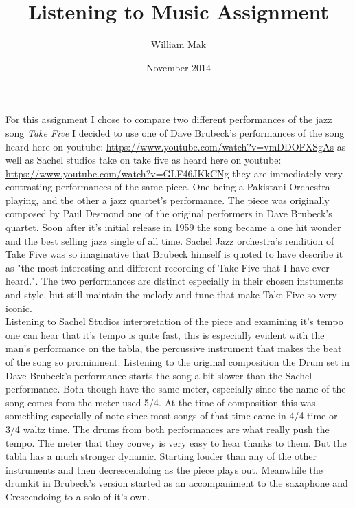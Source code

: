 \documentclass{article}
\title{Listening to Music Assignment}
\author{William Mak}
\date{November 2014}
\begin{document}
\maketitle

For this assignment I chose to compare two different performances of the jazz 
song {\it Take Five} I decided to use one of Dave Brubeck's performances of the 
song heard here on youtube:
\url{https://www.youtube.com/watch?v=vmDDOFXSgAs}
as well as Sachel studios take on take five as heard here on youtube:
\url{https://www.youtube.com/watch?v=GLF46JKkCNg}
they are immediately very contrasting performances of the same piece. One being
a Pakistani Orchestra playing, and the other a jazz quartet's performance. The
piece was originally composed by Paul Desmond one of the original performers in
Dave Brubeck's quartet. Soon after it's initial release in 1959 the song became
a one hit wonder and the best selling jazz single of all time. Sachel Jazz
orchestra's rendition of Take Five was so imaginative that Brubeck himself is
quoted to have describe it as "the most interesting and different recording of
Take Five that I have ever heard.". The two performances are distinct especially
in their chosen instuments and style, but still maintain the melody and tune
that make Take Five so very iconic.\\

Listening to Sachel Studios interpretation of the piece and examining it's tempo
one can hear that it's tempo is quite fast, this is especially evident with the
man's performance on the tabla, the percussive instrument that makes the beat of
the song so promininent. Listening to the original composition the Drum set in
Dave Brubeck's performance starts the song a bit slower than the Sachel
performance. Both though have the same meter, especially since the name of the
song comes from the meter used 5/4. At the time of composition this was
something especially of note since most songs of that time came in 4/4 time or
3/4 waltz time. The drums from both performances are what really push the tempo.
The meter that they convey is very easy to hear thanks to them. But the tabla
has a much stronger dynamic. Starting louder than any of the other instruments
and then decrescendoing as the piece plays out. Meanwhile the drumkit in
Brubeck's version started as an accompaniment to the saxaphone and Crescendoing
to a solo of it's own.\\
\end{document}
